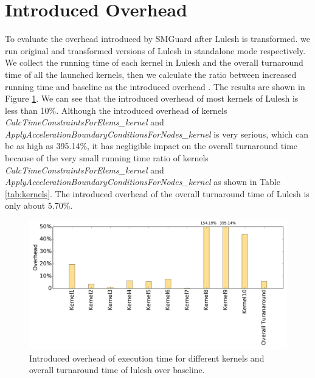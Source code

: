 \documentclass[a4paper,9pt]{article}
\begin{document}
\section{Introduced Overhead}
To evaluate the overhead introduced by SMGuard after Lulesh is transformed. we run original and transformed versions of Lulesh in standalone mode respectively. We collect the running time of each kernel in Lulesh and the overall turnaround time of all the launched kernels, then we calculate the ratio between increased running time and baseline as the introduced overhead . The results are shown in Figure \ref{fig:introduced_overhead}. We can see that the introduced overhead of most kernels of Lulesh is less than 10\%. Although the introduced overhead of kernels \emph{CalcTimeConstraintsForElems\_kernel} and \emph{ApplyAccelerationBoundaryConditionsForNodes\_kernel} is very serious, which can be as high as 395.14\%, it has negligible impact on the overall turnaround time because of the very small running time ratio of kernels \emph{CalcTimeConstraintsForElems\_kernel} and \emph{ApplyAccelerationBoundaryConditionsForNodes\_kernel} as shown in Table \ref{tab:kernels}. The introduced overhead of the overall turnaround time of Lulesh is only about 5.70\%.

\begin{figure}[!t]
	\centering
	\includegraphics[width=6.5in]{fig/lulesh_introduced_overhead.pdf}
	\caption{Introduced overhead of execution time for different kernels and overall turnaround time of lulesh over baseline.}
	\label{fig:introduced_overhead}
\end{figure}
    
\end{document}

